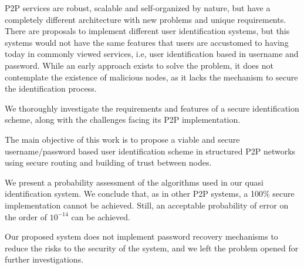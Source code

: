 

P2P services are robust, scalable and self-organized by nature, but have a
completely different architecture with new problems and unique requirements.
There are proposals to implement different user identification systems, but
this systems would not have the same features
 that users are accustomed to having today in commonly
viewed services, i.e, user identification based in username and password. While an
early approach exists to solve the problem, it does not contemplate the existence
of malicious nodes, as it lacks the mechanism to secure the identification
process.

 We thoroughly investigate the requirements and features of a secure
identification scheme, along with the challenges facing its P2P implementation.

The main objective of this work is to propose a viable and secure
username/password based user identification scheme in structured P2P
networks using secure routing and building of trust between nodes.

We present a probability assessment of
the algorithms used in our quasi identification system.
We conclude that, as in other P2P systems, a 100\% secure implementation cannot be achieved. Still, an acceptable probability of error on the order
of $10^{-14}$ can be achieved.

Our proposed system does not implement password recovery mechanisms to reduce the
risks to the security of the system, and we left the problem opened for further
investigations.


